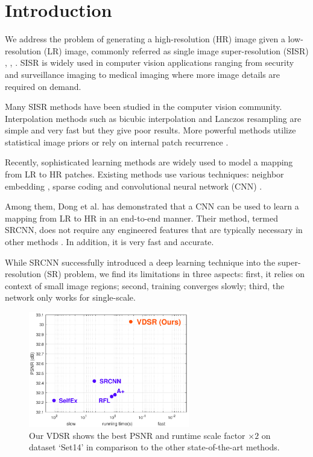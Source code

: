 \documentclass[10pt,twocolumn,letterpaper]{article}
\begin{document}
\section{Introduction}
We address the problem of generating a high-resolution (HR) image given a low-resolution (LR) image, commonly referred as single image super-resolution (SISR) \cite{Irani1991}, \cite{freeman2000learning}, \cite{glasner2009super}. SISR is widely used in computer vision applications ranging from security and surveillance imaging to medical imaging where more image details are required on demand.

Many SISR methods have been studied in the computer vision community. Interpolation methods such as bicubic interpolation and Lanczos resampling \cite{duchon1979lanczos} are simple and very fast but they give poor results. More powerful methods utilize statistical image priors \cite{sun2008image,Kim2010} or rely on internal patch recurrence \cite{glasner2009super}.

Recently, sophisticated learning methods are widely used to model a mapping from LR to HR patches. Existing methods use various techniques: neighbor embedding \cite{chang2004super,bevilacqua2012}, sparse coding \cite{yang2010image,zeyde2012single,Timofte2013,Timofte} and convolutional neural network (CNN) \cite{Dong2014}.

Among them, Dong et al. \cite{Dong2014} has demonstrated that a CNN can be used to learn a mapping from LR to HR in an end-to-end manner. Their method, termed SRCNN, does not require any engineered features that are typically necessary in other methods \cite{yang2010image,zeyde2012single,Timofte2013,Timofte}. In addition, it is very fast and accurate.

While SRCNN successfully introduced a deep learning technique into the super-resolution (SR) problem, we find its limitations in three aspects: first, it relies on context of small image regions; second, training converges slowly; third, the network only works for single-scale.

\begin{figure}
\centering
{\graphicspath{{figs/figf/}}\includegraphics[width=7cm]{frontfig}}
\caption{Our VDSR shows the best PSNR and runtime scale factor $\times2$ on dataset `Set14' in comparison to the other state-of-the-art methods.}
\end{figure}
\end{document}
